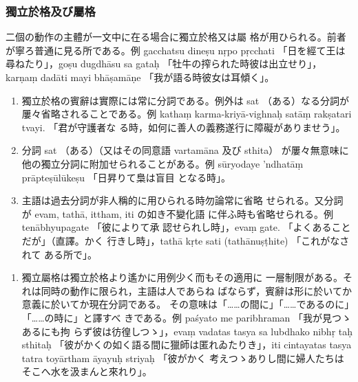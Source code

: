 \subsubsection{獨立於格及び屬格}
\numberParagraph \label{np:231}
二個の動作の主體が一文中に在る場合に獨立於格又は屬
格が用ひられる。前者が寧ろ普通に見る所である。例 gacchatsu
dineṣu nṛpo pṛcchati 「日を經て王は尋ねたり」，goṣu dugdhāsu
sa gataḥ 「牡牛の搾られた時彼は出立せり」，karṇaṃ dadāti
mayi bhāṣamāṇe 「我が語る時彼女は耳傾く」。
\begin{enumerate}[label=(\alph*)]
\item 獨立於格の賓辭は實際には常に分詞である。例外は sat
（ある）なる分詞が屢々省略されることである。例 kathaṃ
karma-kriyā-vighnaḥ satāṃ rakṣatari tvayi. 「君が守護者な
る時，如何に善人の義務遂行に障礙がありませう」。
\item 分詞 sat （ある）（又はその同意語 vartamāna 及び sthita）
が屢々無意味に他の獨立分詞に附加せられることがある。例
sūryodaye 'ndhatāṃ prāpteṣūlūkeṣu 「日昇りて梟は盲目
となる時」。
\item 主語は過去分詞が非人稱的に用ひられる時勿論常に省略
せられる。又分詞が evam, tathā, ittham, iti の如き不變化語
に伴ふ時も省略せられる。例 tenābhyupagate 「彼によりて承
認せられし時」，evaṃ gate. 「よくあることだが」（直譯。かく
行きし時」，tathā kṛte sati (tathānuṣṭhite) 「これがなされて
ある所で」。
\end{enumerate}
\begin{enumerate}[label=(\arabic*), start=2]
\item 獨立屬格は獨立於格より遙かに用例少く而もその適用に
一層制限がある。それは同時の動作に限られ，主語は人であらね
ばならず，賓辭は形に於いてか意義に於いてか現在分詞である。
その意味は「……の間に」「……であるのに」「……の時に」と譯すべ
きである。例 paśyato me paribhraman 「我が見つゝあるにも拘
らず彼は彷徨しつゝ」，evaṃ vadatas tasya sa lubdhako nibhṛ\-%
taḥ sthitaḥ 「彼がかくの如く語る間に獵師は匿れゐたりき」，iti
cintayatas tasya tatra toyārtham āyayuḥ striyaḥ 「彼がかく
考えつゝありし間に婦人たちはそこへ水を汲まんと來れり」。
\end{enumerate}

